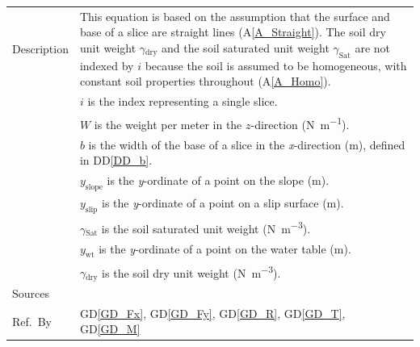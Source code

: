 \documentclass[12pt]{article}
\newcommand{\colAwidth}{0.13\textwidth}
\newcommand{\colBwidth}{0.82\textwidth}
\newcommand{\aref}[1]{A\ref{#1}}
\newcommand{\ddref}[1]{DD\ref{#1}}
\newcommand{\dref}[1]{GD\ref{#1}}
\begin{document}
\begin{minipage}{\textwidth}
\begin{tabular}{| p{\colAwidth} | p{\colBwidth} |}
\hline Description &This equation is based on the assumption that the surface 
and base of a slice are straight lines (\aref{A_Straight}). The soil dry unit 
weight $\gamma{}_{\text{dry}}$ and the soil saturated unit weight 
$\gamma_\text{Sat}$ are not 
indexed by $i$ because the soil is assumed to be homogeneous, with constant 
soil properties throughout (\aref{A_Homo}).\\
&$i$ is the index representing a single slice.\\
&$W$ is the weight per meter in the $z$-direction (\si{\newton\per\meter}).\\
&$b$ is the width of the base of a slice in the \textit{x}-direction 
(\si{\meter}), defined in \ddref{DD_b}.\\
&${y_{\text{slope}}}$ is the \textit{y}-ordinate of a point on the slope 
(\si{\meter}).\\
&${y_{\text{slip}}}$ is the \textit{y}-ordinate of a point on a slip surface 
(\si{\meter}).\\
&${\gamma{}_{\text{Sat}}}$ is the soil saturated unit weight 
(\si{\newton\per\meter\cubed}).\\
&${y_{\text{wt}}}$ is the \textit{y}-ordinate of a point on the water table 
(\si{\meter}).\\
&$\gamma{}_{\text{dry}}$ is the soil dry unit weight 
(\si{\newton\per\meter\cubed}).
\\

\hline Sources& \cite{FredlundKrahn}\\

\hline Ref.\ By & \dref{GD_Fx}, \dref{GD_Fy}, \dref{GD_R}, 
\dref{GD_T}, \dref{GD_M}\\

\hline
\end{tabular}
\end{minipage}\\


~\newline

\end{document}
